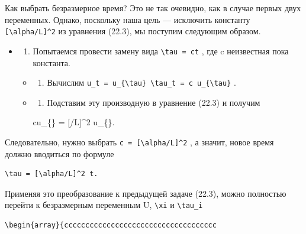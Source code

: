 \documentclass[
  ukrainian,
]{article}
\providecommand{\tightlist}{%
  \setlength{\itemsep}{0pt}\setlength{\parskip}{0pt}}
\begin{document}
Как выбрать безразмерное время? Это не так очевидно, как в случае первых
двух переменных. Однако, поскольку наша цель --- исключить константу
\texttt{{[}\textbackslash{}alpha/L{]}\^{}2} из уравнения (22.3), мы
поступим следующим образом.

\begin{itemize}
\item
  \begin{enumerate}
  \def\labelenumi{\arabic{enumi}.}
  \tightlist
  \item
    Попытаемся провести замену вида \texttt{\textbackslash{}tau\ =\ ct}
    , где c неизвестная пока константа.
  \end{enumerate}

  \begin{itemize}
  \item
    \begin{enumerate}
    \def\labelenumi{\arabic{enumi}.}
    \setcounter{enumi}{1}
    \tightlist
    \item
      Вычислим
      \texttt{u\_t\ =\ u\_\{\textbackslash{}tau\}\ \textbackslash{}tau\_t\ =\ c\ u\_\{\textbackslash{}tau\}}
      .
    \end{enumerate}
  \item
    \begin{enumerate}
    \def\labelenumi{\arabic{enumi}.}
    \setcounter{enumi}{2}
    \tightlist
    \item
      Подставим эту производную в уравнение (22.3) и получим
    \end{enumerate}

    cu\_\{\} = {[}\alpha/L{]}\^{}2 u\_\{\xi\xi\}.
  \end{itemize}
\end{itemize}

Следовательно, нужно выбрать
\texttt{c\ =\ {[}\textbackslash{}alpha/L{]}\^{}2} , а значит, новое
время должно вводиться по формуле

\begin{verbatim}
\tau = [\alpha/L]^2 t.
\end{verbatim}

Применяя это преобразование к предыдущей задаче (22.3), можно полностью
перейти к безразмерным переменным U, \texttt{\textbackslash{}xi} и
\texttt{\textbackslash{}tau\_i}

\begin{verbatim}
\begin{array}{cccccccccccccccccccccccccccccccccccc
\end{verbatim}
\end{document}
